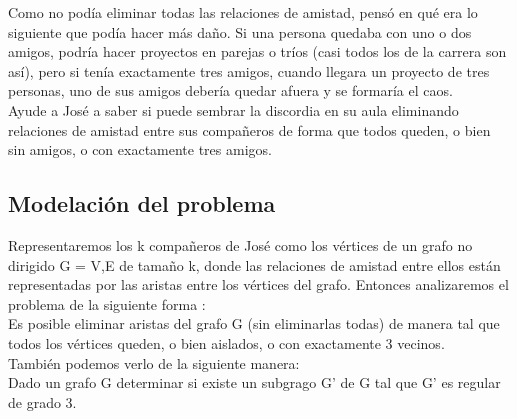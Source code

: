 \documentclass[
10pt, %
a4paper, %
oneside, %
headinclude,footinclude, %
BCOR5mm, %
]{scrartcl}
\begin{document}
Como no podía eliminar todas las relaciones de amistad, pensó en qué era lo siguiente que podía hacer más daño. Si una persona quedaba con
uno o dos amigos, podría hacer proyectos en parejas o tríos (casi todos los de la carrera son así), pero si tenía exactamente tres amigos,
cuando llegara un proyecto de tres personas, uno de sus amigos debería quedar afuera y se formaría el caos. \\

Ayude a José a saber si puede sembrar la discordia en su aula eliminando relaciones de amistad entre sus compañeros de forma que todos queden, o bien sin amigos, o con exactamente tres amigos.







\subsection{Modelación del problema}

Representaremos los k compañeros de José como los vértices de un grafo no dirigido G = {V,E} de tamaño k, donde las relaciones de amistad entre ellos están representadas
por las aristas entre los vértices del grafo. Entonces analizaremos el problema de la siguiente forma :\\

Es posible eliminar aristas del grafo G (sin eliminarlas todas) de manera tal que todos los vértices queden, o bien aislados, o con exactamente 3 vecinos. \\

También podemos verlo de la siguiente manera: \\

Dado un grafo G determinar si existe un subgrago G' de G tal que G' es regular de grado 3.\\
\end{document}
